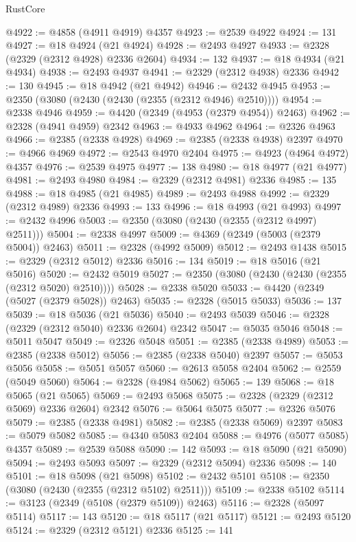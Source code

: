 \begin{lexlean}{RustCore}
\begin{coremodule}
@4922 := @4858 (@4911 @4919) @4357
@4923 := @2539 @4922
@4924 := 131
@4927 := @18 @4924 (@21 @4924)
@4928 := @2493 @4927
@4933 := @2328 (@2329 (@2312 @4928) @2336 @2604)
@4934 := 132
@4937 := @18 @4934 (@21 @4934)
@4938 := @2493 @4937
@4941 := @2329 (@2312 @4938) @2336
@4942 := 130
@4945 := @18 @4942 (@21 @4942)
@4946 := @2432 @4945
@4953 := @2350 (@3080 (@2430 (@2430 (@2355 (@2312 @4946) @2510))))
@4954 := @2338 @4946
@4959 := @4420 (@2349 (@4953 (@2379 @4954)) @2463)
@4962 := @2328 (@4941 @4959) @2342
@4963 := @4933 @4962
@4964 := @2326 @4963
@4966 := @2385 (@2338 @4928)
@4969 := @2385 (@2338 @4938) @2397
@4970 := @4966 @4969
@4972 := @2543 @4970 @2404
@4975 := @4923 (@4964 @4972) @4357
@4976 := @2539 @4975
@4977 := 138
@4980 := @18 @4977 (@21 @4977)
@4981 := @2493 @4980
@4984 := @2329 (@2312 @4981) @2336
@4985 := 135
@4988 := @18 @4985 (@21 @4985)
@4989 := @2493 @4988
@4992 := @2329 (@2312 @4989) @2336
@4993 := 133
@4996 := @18 @4993 (@21 @4993)
@4997 := @2432 @4996
@5003 := @2350 (@3080 (@2430 (@2355 (@2312 @4997) @2511)))
@5004 := @2338 @4997
@5009 := @4369 (@2349 (@5003 (@2379 @5004)) @2463)
@5011 := @2328 (@4992 @5009)
@5012 := @2493 @1438
@5015 := @2329 (@2312 @5012) @2336
@5016 := 134
@5019 := @18 @5016 (@21 @5016)
@5020 := @2432 @5019
@5027 := @2350 (@3080 (@2430 (@2430 (@2355 (@2312 @5020) @2510))))
@5028 := @2338 @5020
@5033 := @4420 (@2349 (@5027 (@2379 @5028)) @2463)
@5035 := @2328 (@5015 @5033)
@5036 := 137
@5039 := @18 @5036 (@21 @5036)
@5040 := @2493 @5039
@5046 := @2328 (@2329 (@2312 @5040) @2336 @2604) @2342
@5047 := @5035 @5046
@5048 := @5011 @5047
@5049 := @2326 @5048
@5051 := @2385 (@2338 @4989)
@5053 := @2385 (@2338 @5012)
@5056 := @2385 (@2338 @5040) @2397
@5057 := @5053 @5056
@5058 := @5051 @5057
@5060 := @2613 @5058 @2404
@5062 := @2559 (@5049 @5060)
@5064 := @2328 (@4984 @5062)
@5065 := 139
@5068 := @18 @5065 (@21 @5065)
@5069 := @2493 @5068
@5075 := @2328 (@2329 (@2312 @5069) @2336 @2604) @2342
@5076 := @5064 @5075
@5077 := @2326 @5076
@5079 := @2385 (@2338 @4981)
@5082 := @2385 (@2338 @5069) @2397
@5083 := @5079 @5082
@5085 := @4340 @5083 @2404
@5088 := @4976 (@5077 @5085) @4357
@5089 := @2539 @5088
@5090 := 142
@5093 := @18 @5090 (@21 @5090)
@5094 := @2493 @5093
@5097 := @2329 (@2312 @5094) @2336
@5098 := 140
@5101 := @18 @5098 (@21 @5098)
@5102 := @2432 @5101
@5108 := @2350 (@3080 (@2430 (@2355 (@2312 @5102) @2511)))
@5109 := @2338 @5102
@5114 := @3123 (@2349 (@5108 (@2379 @5109)) @2463)
@5116 := @2328 (@5097 @5114)
@5117 := 143
@5120 := @18 @5117 (@21 @5117)
@5121 := @2493 @5120
@5124 := @2329 (@2312 @5121) @2336
@5125 := 141

\end{coremodule}
\end{lexlean}
